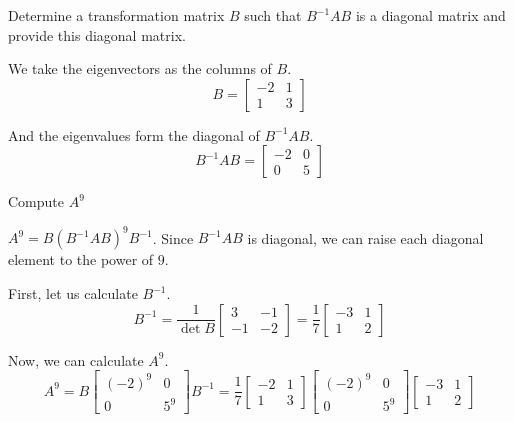 \documentclass[a4paper,11pt]{exam}
\begin{document}
\begin{questions}
\begin{parts}
\begin{subparts}
            \subpart Determine a transformation matrix $B$ such that $B^{-1} A B$ is a diagonal matrix and provide this diagonal matrix.

            \begin{solution}
                We take the eigenvectors as the columns of $B$.
                \[
                    B = \left[\begin{array}{cc} -2 & 1 \\ 1 & 3 \end{array}\right]
                \]

                And the eigenvalues form the diagonal of $B^{-1} A B$.
                \[
                    B^{-1} A B
                    = \left[\begin{array}{cc} -2 & 0 \\ 0 & 5 \end{array}\right]
                \]
            \end{solution}

            \subpart Compute $A^9$

            \begin{solution}
                $A^9 = B(B^{-1} A B)^9 B^{-1}$. Since $B^{-1} A B$ is diagonal, we can raise each diagonal element to the power of $9$.

                First, let us calculate $B^{-1}$.
                \[
                    B^{-1} = \frac{1}{\operatorname{det} B} \left[\begin{array}{cc} 3 & -1 \\ -1 & -2 \end{array}\right]
                    = \frac{1}{7} \left[\begin{array}{cc} -3 & 1 \\ 1 & 2 \end{array}\right]
                \]

                Now, we can calculate $A^9$.
                \[
                    A^9 = B \left[\begin{array}{cc} (-2)^9 & 0 \\ 0 & 5^9 \end{array}\right] B^{-1}
                    = \frac{1}{7} \left[\begin{array}{cc} -2 & 1 \\ 1 & 3 \end{array}\right]
                    \left[\begin{array}{cc} (-2)^9 & 0 \\ 0 & 5^9 \end{array}\right]
                    \left[\begin{array}{cc} -3 & 1 \\ 1 & 2 \end{array}\right]
                \]


\end{solution}
\end{subparts}
\end{parts}
\end{questions}
\end{document}
